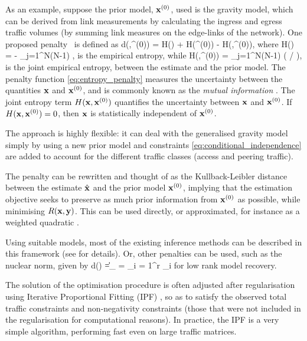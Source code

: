 As an example, suppose the prior
model, $\mathbf{x}^{(0)}$, used is the gravity model, which can be derived
from link measurements by calculating the ingress and egress traffic
volumes (by summing link measures on the edge-links of the network). 
One proposed penalty~\cite{Zhang05InfoTh} is defined as 
\be d(\hat{\bx},\bx^{(0)}) = H(\hat{\bx}) + H(\bx^{(0)}) - H(\hat{\bx},\bx^{(0)}),
\label{eq:entropy_penalty}
\ee
where 
\be
H(\bx) = - \sum_{j=1}^{N(N-1)}  \log {},
\label{eq:entropy}
\ee
is the empirical entropy, while 
\be
H(\bx,\bx^{(0)}) = \sum_{j=1}^{N(N-1)}  \log ( \Big/  
),
\label{eq:joint_entropy}
\ee
is the joint empirical entropy, between the estimate and the prior model. The penalty function \eqref{eq:entropy_penalty} measures 
the uncertainty between the quantities $\mathbf{x}$ and $\mathbf{x}^{(0)}$, and is commonly known as the \emph{mutual information} 
\cite{Cover06InfoTheory}. The joint entropy term $H(\mathbf{x},\mathbf{x}^{(0)})$ quantifies the uncertainty between $\mathbf{x}$ and 
$\mathbf{x}^{(0)}$. If $H(\mathbf{x},\mathbf{x}^{(0)}) = 0$, then $\mathbf{x}$ is statistically
independent of $\mathbf{x}^{(0)}$. 

The approach is highly flexible: it can deal with the generalised
gravity model simply by using a new prior model and constraints
\eqref{eq:conditional_independence} are added to account for the
different traffic classes (access and peering traffic).

The penalty can be rewritten and thought of as the Kullback-Leibler
distance \cite{Cover06InfoTheory} between the estimate $\hat{\mathbf{x}}$ and
the prior model $\mathbf{x}^{(0)}$, implying that the estimation objective
seeks to preserve as much prior information from $\mathbf{x}^{(0)}$ as
possible, while minimising $R(\mathbf{x},\mathbf{y})$. This can be used directly, or
approximated, for instance as a weighted quadratic
\cite{Zhang03InfoSIGCOMM,Zhang03Fast}. 

Using suitable models, most of the existing inference methods can be
described in this framework (see \cite{Zhang05InfoTh} for details).
Or, other penalties can be used, such as the nuclear norm, given by
\be 
  d(\bX) =\|\bX\|_{\ast} = \sum_{i = 1}^r \sigma_i
  \label{eq:nuclear_penalty}
\ee
for low rank model recovery. 

The solution of the optimisation procedure is often adjusted after
regularisation using Iterative Proportional Fitting (IPF)
\cite{Deming40IPF}, so as to satisfy the observed total traffic
constraints and non-negativity constraints (those that were not
included in the regularisation for computational reasons). In
practice, the IPF is a very simple algorithm, performing fast even on
large traffic matrices. 

